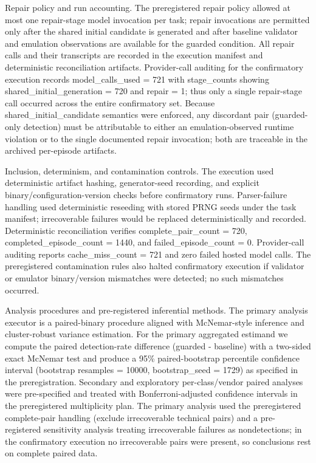 \documentclass[conference]{IEEEtran}
\begin{document}
Repair policy and run accounting. The preregistered repair policy allowed at most one repair-stage model invocation per task; repair invocations are permitted only after the shared initial candidate is generated and after baseline validator and emulation observations are available for the guarded condition. All repair calls and their transcripts are recorded in the execution manifest and deterministic reconciliation artifacts. Provider-call auditing for the confirmatory execution records model\_calls\_used = 721 with stage\_counts showing shared\_initial\_generation = 720 and repair = 1; thus only a single repair-stage call occurred across the entire confirmatory set. Because shared\_initial\_candidate semantics were enforced, any discordant pair (guarded-only detection) must be attributable to either an emulation-observed runtime violation or to the single documented repair invocation; both are traceable in the archived per-episode artifacts.

Inclusion, determinism, and contamination controls. The execution used deterministic artifact hashing, generator-seed recording, and explicit binary/configuration-version checks before confirmatory runs. Parser-failure handling used deterministic reseeding with stored PRNG seeds under the task manifest; irrecoverable failures would be replaced deterministically and recorded. Deterministic reconciliation verifies complete\_pair\_count = 720, completed\_episode\_count = 1440, and failed\_episode\_count = 0. Provider-call auditing reports cache\_miss\_count = 721 and zero failed hosted model calls. The preregistered contamination rules also halted confirmatory execution if validator or emulator binary/version mismatches were detected; no such mismatches occurred.

Analysis procedures and pre-registered inferential methods. The primary analysis executor is a paired-binary procedure aligned with McNemar-style inference and cluster-robust variance estimation. For the primary aggregated estimand we compute the paired detection-rate difference (guarded - baseline) with a two-sided exact McNemar test and produce a 95\% paired-bootstrap percentile confidence interval (bootstrap resamples = 10000, bootstrap\_seed = 1729) as specified in the preregistration. Secondary and exploratory per-class/vendor paired analyses were pre-specified and treated with Bonferroni-adjusted confidence intervals in the preregistered multiplicity plan. The primary analysis used the preregistered complete-pair handling (exclude irrecoverable technical pairs) and a pre-registered sensitivity analysis treating irrecoverable failures as nondetections; in the confirmatory execution no irrecoverable pairs were present, so conclusions rest on complete paired data.
\end{document}
